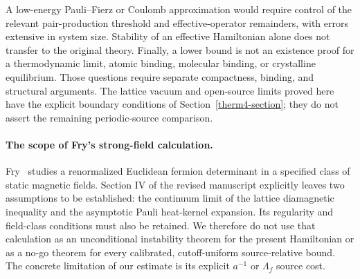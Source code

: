 A low-energy Pauli--Fierz or Coulomb approximation would require control
of the relevant pair-production threshold and effective-operator
remainders, with errors extensive in system size.  Stability of an
effective Hamiltonian alone does not transfer to the original theory.
Finally, a lower bound is not an existence proof for a thermodynamic
limit, atomic binding, molecular binding, or crystalline equilibrium.
Those questions require separate compactness, binding, and structural
arguments. The lattice vacuum and open-source limits proved here have
the explicit boundary conditions of Section~\ref{therm4-section};
they do not assert the remaining periodic-source comparison.

\paragraph{The scope of Fry's strong-field calculation.}
Fry~\cite{Fry} studies a renormalized Euclidean fermion determinant
in a specified class of static magnetic fields. Section IV of the
revised manuscript explicitly leaves two assumptions to be established:
the continuum limit of the lattice diamagnetic inequality and the
asymptotic Pauli heat-kernel expansion. Its regularity and field-class
conditions must also be retained. We therefore do not use that
calculation as an unconditional instability theorem for the present
Hamiltonian or as a no-go theorem for every calibrated,
cutoff-uniform source-relative bound. The concrete limitation of
our estimate is its explicit $a^{-1}$ or $\Lambda_f$ source cost.
